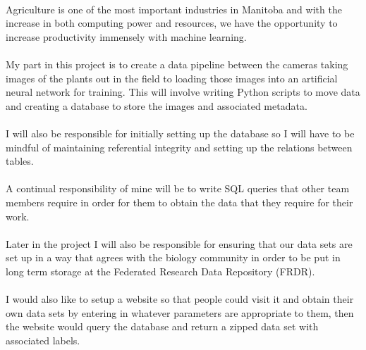 \documentclass[12pt]{article}
\begin{document}
		\paragraph{}
			Agriculture is one of the most important industries in Manitoba and with the increase in both computing power and resources, we have the opportunity to increase productivity immensely with machine learning.
			
		\paragraph{}
			My part in this project is to create a data pipeline between the cameras taking images of the plants out in the field to loading those images into an artificial neural network for training.  This will involve writing Python scripts to move data and creating a database to store the images and associated metadata.
			
		\paragraph{}
			I will also be responsible for initially setting up the database so I will have to be mindful of maintaining referential integrity and setting up the relations between tables.
			
		\paragraph{}
			A continual responsibility of mine will be to write SQL queries that other team members require in order for them to obtain the data that they require for their work.
			
		\paragraph{}
			Later in the project I will also be responsible for ensuring that our data sets are set up in a way that agrees with the biology community in order to be put in long term storage at the Federated Research Data Repository (FRDR).
			
		\paragraph{}
			I would also like to setup a website so that people could visit it and obtain their own data sets by entering in whatever parameters are appropriate to them, then the website would query the database and return a zipped data set with associated labels.
	
\end{document}
